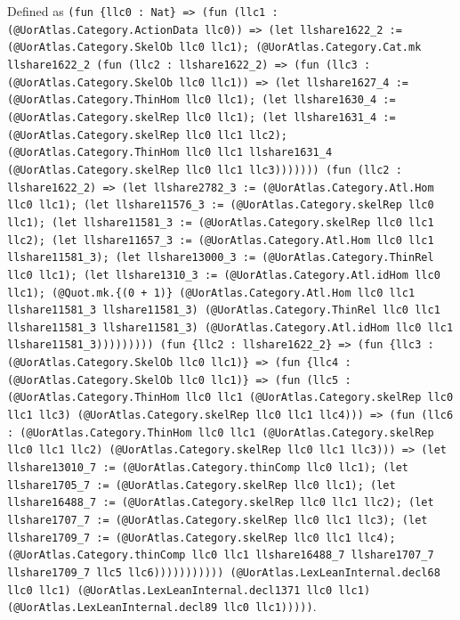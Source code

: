 \documentclass[11pt]{article}
\begin{document}
\noindent Defined as \texttt{(fun \{llc0 : Nat\} => (fun (llc1 : (@UorAtlas.Category.ActionData llc0)) => (let llshare1622\_2 := (@UorAtlas.Category.SkelOb llc0 llc1); (@UorAtlas.Category.Cat.mk llshare1622\_2 (fun (llc2 : llshare1622\_2) => (fun (llc3 : (@UorAtlas.Category.SkelOb llc0 llc1)) => (let llshare1627\_4 := (@UorAtlas.Category.ThinHom llc0 llc1); (let llshare1630\_4 := (@UorAtlas.Category.skelRep llc0 llc1); (let llshare1631\_4 := (@UorAtlas.Category.skelRep llc0 llc1 llc2); (@UorAtlas.Category.ThinHom llc0 llc1 llshare1631\_4 (@UorAtlas.Category.skelRep llc0 llc1 llc3))))))) (fun (llc2 : llshare1622\_2) => (let llshare2782\_3 := (@UorAtlas.Category.Atl.Hom llc0 llc1); (let llshare11576\_3 := (@UorAtlas.Category.skelRep llc0 llc1); (let llshare11581\_3 := (@UorAtlas.Category.skelRep llc0 llc1 llc2); (let llshare11657\_3 := (@UorAtlas.Category.Atl.Hom llc0 llc1 llshare11581\_3); (let llshare13000\_3 := (@UorAtlas.Category.ThinRel llc0 llc1); (let llshare1310\_3 := (@UorAtlas.Category.Atl.idHom llc0 llc1); (@Quot.mk.\{(0 + 1)\} (@UorAtlas.Category.Atl.Hom llc0 llc1 llshare11581\_3 llshare11581\_3) (@UorAtlas.Category.ThinRel llc0 llc1 llshare11581\_3 llshare11581\_3) (@UorAtlas.Category.Atl.idHom llc0 llc1 llshare11581\_3))))))))) (fun \{llc2 : llshare1622\_2\} => (fun \{llc3 : (@UorAtlas.Category.SkelOb llc0 llc1)\} => (fun \{llc4 : (@UorAtlas.Category.SkelOb llc0 llc1)\} => (fun (llc5 : (@UorAtlas.Category.ThinHom llc0 llc1 (@UorAtlas.Category.skelRep llc0 llc1 llc3) (@UorAtlas.Category.skelRep llc0 llc1 llc4))) => (fun (llc6 : (@UorAtlas.Category.ThinHom llc0 llc1 (@UorAtlas.Category.skelRep llc0 llc1 llc2) (@UorAtlas.Category.skelRep llc0 llc1 llc3))) => (let llshare13010\_7 := (@UorAtlas.Category.thinComp llc0 llc1); (let llshare1705\_7 := (@UorAtlas.Category.skelRep llc0 llc1); (let llshare16488\_7 := (@UorAtlas.Category.skelRep llc0 llc1 llc2); (let llshare1707\_7 := (@UorAtlas.Category.skelRep llc0 llc1 llc3); (let llshare1709\_7 := (@UorAtlas.Category.skelRep llc0 llc1 llc4); (@UorAtlas.Category.thinComp llc0 llc1 llshare16488\_7 llshare1707\_7 llshare1709\_7 llc5 llc6))))))))))) (@UorAtlas.LexLeanInternal.decl68 llc0 llc1) (@UorAtlas.LexLeanInternal.decl1371 llc0 llc1) (@UorAtlas.LexLeanInternal.decl89 llc0 llc1)))))}.\par
\end{document}
